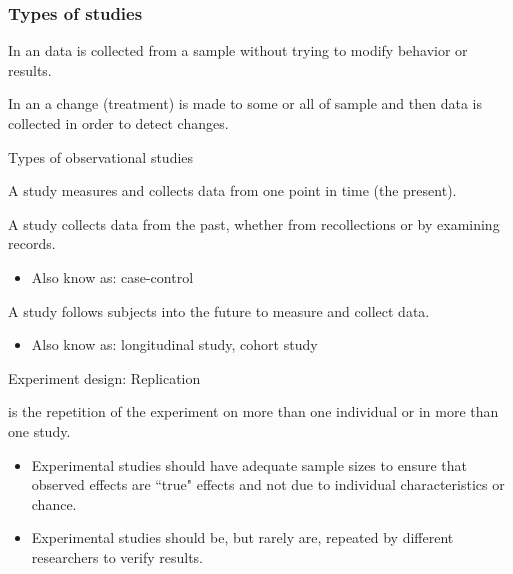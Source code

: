 \documentclass[xcolor=table]{beamer}
\begin{document}
\begin{frame}
\frametitle{Types of studies}

\begin{block}{}
\large In an  data is collected from a sample without trying to modify behavior or results. 
\end{block}
\pause
\begin{block}{}
\large In an  a change (treatment) is made to some or all of sample and then data is collected in order to detect changes. 
\end{block}

\end{frame}

\begin{frame}{Types of observational studies}

\begin{block}{}
\large
A  study measures and collects data from one point in time (the present).
\end{block}
\pause
\begin{block}{}
\large
A  study collects data from the past, whether from recollections or by examining records.
\begin{itemize}
\item Also know as: case-control
\end{itemize}
\end{block}
\pause
\begin{block}{}
\large
A  study follows subjects into the future to measure and collect data.
\begin{itemize}
\item Also know as: longitudinal study, cohort study
\end{itemize}
\end{block}
\end{frame}

\begin{frame}{Experiment design: Replication}
\begin{block}{}
\large
{} is the repetition of the experiment on more than one individual or in more than one study.

\begin{itemize}
\pause\item Experimental studies should have adequate sample sizes to ensure that observed effects are ``true" effects and not due to individual characteristics or chance.
\pause\item Experimental studies should be, but rarely are, repeated by different researchers to verify results.
\end{itemize}
\end{block}
\end{frame}
\end{document}
